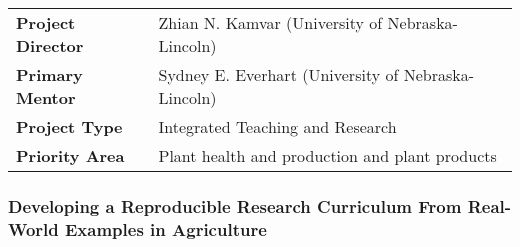 \documentclass[12pt,letterpaper]{article}
\title{\ruleline{Project Summary}}
\begin{document}
\maketitle

\vspace{2em}

\begin{centering}
\begin{tabular}{ll}
\textbf{Project Director} & Zhian N. Kamvar (University of Nebraska-Lincoln)\\
\textbf{Primary Mentor  } & Sydney E. Everhart (University of Nebraska-Lincoln)\\
\textbf{Project Type    } & Integrated Teaching and Research\\
\textbf{Priority Area   } & Plant health and production and plant products
\end{tabular}
\end{centering}

\vspace{2em}

\subsubsection*{Developing a Reproducible Research Curriculum From Real-World Examples in Agriculture}
\end{document}
